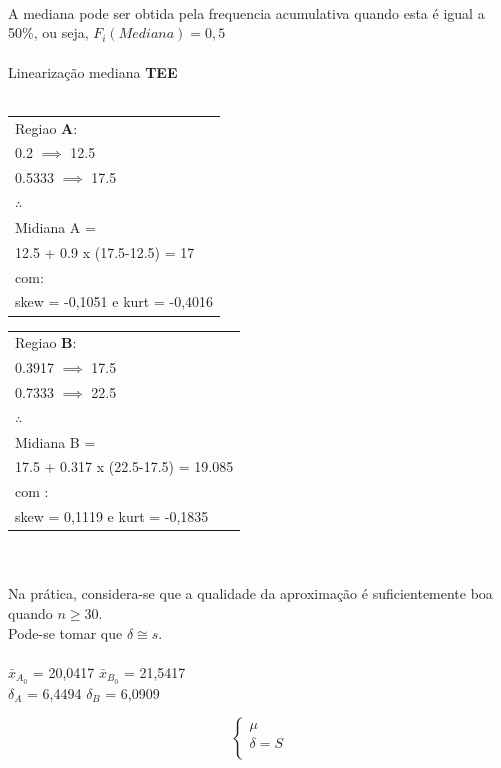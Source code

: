 \\
\\
\\
\noindent
A mediana pode ser obtida pela frequencia acumulativa quando esta é igual a 50\%, ou seja, $F_i(Mediana)=0,5$ \\
\\
Linearização mediana \textbf{TEE}\\
\\
\begin{minipage}[l]{0pt}
\begin{tabular}{l}
Regiao \textbf{A}:\\
0.2 $\implies$ 12.5 \\
0.5333 $\implies$ 17.5 \\
$\therefore$\\
Midiana A = \\
12.5 + 0.9 x (17.5-12.5) = 17 \\
com: \\
skew = -0,1051 e kurt = -0,4016 \\
\end{tabular}
\end{minipage} \hspace{10cm}
\begin{minipage}[l]{0pt}
\begin{tabular}{l}
Regiao \textbf{B}: \\
0.3917 $\implies$ 17.5 \\
0.7333 $\implies$ 22.5 \\
$\therefore$\\
Midiana B = \\
17.5 + 0.317 x (22.5-17.5) = 19.085 \\
com : \\
skew = 0,1119 e kurt = -0,1835 \\
\end{tabular}
\end{minipage}\\
\\
\noindent
Na prática, considera-se que a qualidade da aproximação é suficientemente boa quando $n \geqslant 30$.  \\
Pode-se tomar que $\delta \cong s$. \\
\\
$\bar{x}_{A_0}$ = 20,0417 \qquad $\bar{x}_{B_0}$ = 21,5417 \\
$\delta_A$ = 6,4494 \qquad $\delta_B$ = 6,0909\\
\begin{minipage}[l]{0pt}
$$\left\lbrace\begin{array}{c}
\mu \\
\delta=S \\
\end{array}\right.$$
\end{minipage}
